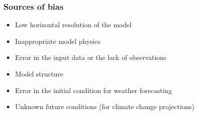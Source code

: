 \documentclass[11pt]{article}
\begin{document}
\subsubsection{Sources of bias}
\label{sec:org910445b}
\begin{itemize}
\item Low horizontal resolution of the model
\item Inappropriate model physics
\item Error in the input data or the lack of observations
\item Model structure
\item Error in the initial condition for weather forecasting
\item Unknown future conditions (for climate change projections)
\end{itemize}
\end{document}
